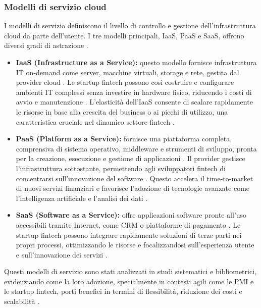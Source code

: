 \subsubsection{Modelli di servizio cloud}

I modelli di servizio definiscono il livello di controllo e gestione dell'infrastruttura cloud da parte dell'utente. I tre modelli principali, IaaS, PaaS e SaaS, offrono diversi gradi di astrazione \cite{redhat2025cloud}.

\begin{itemize}
    \item \textbf{IaaS (Infrastructure as a Service):} questo modello fornisce infrastruttura IT on-demand come server, macchine virtuali, storage e rete, gestita dal provider cloud \cite{redhat2025cloud}. Le startup fintech possono così costruire e configurare ambienti IT complessi senza investire in hardware fisico, riducendo i costi di avvio e manutenzione \cite{vats2024systematic}. L'elasticità dell'IaaS consente di scalare rapidamente le risorse in base alla crescita del business o ai picchi di utilizzo, una caratteristica cruciale nel dinamico settore fintech \cite{vats2024systematic, hrmars2025cloud}.
    
    \item \textbf{PaaS (Platform as a Service):} fornisce una piattaforma completa, comprensiva di sistema operativo, middleware e strumenti di sviluppo, pronta per la creazione, esecuzione e gestione di applicazioni \cite{redhat2025cloud}. Il provider gestisce l'infrastruttura sottostante, permettendo agli sviluppatori fintech di concentrarsi sull'innovazione del software \cite{vats2024systematic}. Questo accelera il time-to-market di nuovi servizi finanziari e favorisce l'adozione di tecnologie avanzate come l'intelligenza artificiale e l'analisi dei dati \cite{vats2024systematic}.
    
    \item \textbf{SaaS (Software as a Service):} offre applicazioni software pronte all'uso accessibili tramite Internet, come CRM o piattaforme di pagamento \cite{redhat2025cloud}. Le startup fintech possono integrare rapidamente soluzioni di terze parti nei propri processi, ottimizzando le risorse e focalizzandosi sull'esperienza utente e sull'innovazione dei servizi \cite{vats2024systematic}.
\end{itemize}

Questi modelli di servizio sono stati analizzati in studi sistematici e bibliometrici, evidenziando come la loro adozione, specialmente in contesti agili come le PMI e le startup fintech, porti benefici in termini di flessibilità, riduzione dei costi e scalabilità \cite{vats2024systematic, hrmars2025cloud}.

